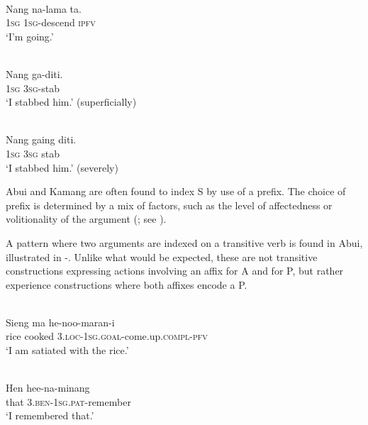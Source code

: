 \ea%
\label{ex:1:17}
 \\
\gll  Nang   na-lama   ta.  \\
 1\textsc{sg}   \textsc{1sg}{}-descend   \textsc{ipfv}  \\
\glt `I'm going.'
\z
 

\ea%
\label{ex:1:18}
 \\
\gll Nang    ga-diti. \\
1\textsc{sg}    3\textsc{sg}{}-stab     \\
\glt `I stabbed him.' (superficially)  
\z
 

  

\ea%
\label{ex:1:19}
 \\
\gll Nang  gaing   diti. \\
 1\textsc{sg}   3\textsc{sg}  stab  \\
\glt `I stabbed him.' (severely)
\z
 


Abui and Kamang are often found to index S by use of a prefix. The choice of prefix is determined by a mix of factors, such as the level of affectedness or volitionality of the argument (\citealt{FeddenEtAl2013,FeddenEtAl2014}; see \citealt{FeddenEtAlTV}). 

A pattern where two arguments are indexed on a transitive verb is found in Abui, illustrated in -. Unlike what would be expected, these are not transitive constructions expressing actions involving an affix for A and for P, but rather experience constructions where both affixes encode a P. 



\ea%
\label{ex:1:20}
 \\
\gll Sieng   ma     he-noo-maran-i \\
rice   cooked   3.\textsc{loc}{}-1\textsc{sg}.\textsc{goal}{}-come.up.\textsc{compl-pfv}   \\
\glt `I am satiated with the rice.'
\z
 







\ea%
\label{ex:1:21}
 \\
\gll Hen   hee-na-minang  \\
 that   3.\textsc{ben}{}-1\textsc{sg}.\textsc{pat}{}-remember  \\
\glt `I remembered that.'
\z
 
